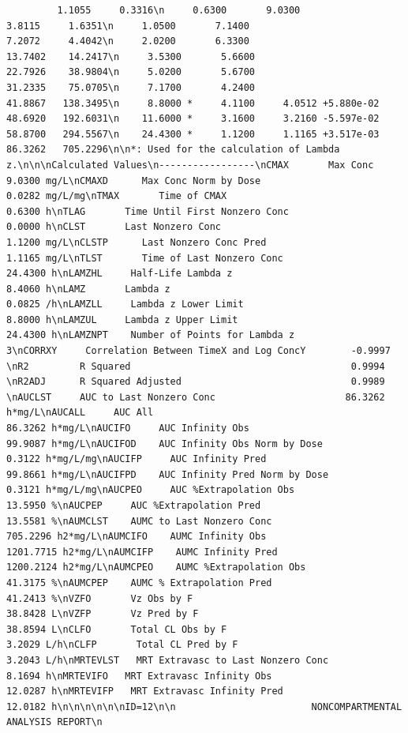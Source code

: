 \documentclass[]{krantz}
\theoremstyle{definition}
\theoremstyle{definition}
\theoremstyle{definition}
\theoremstyle{remark}
\begin{document}
\begin{verbatim}
         1.1055     0.3316\n     0.6300       9.0300                           3.8115     1.6351\n     1.0500       7.1400                           7.2072     4.4042\n     2.0200       6.3300                          13.7402    14.2417\n     3.5300       5.6600                          22.7926    38.9804\n     5.0200       5.6700                          31.2335    75.0705\n     7.1700       4.2400                          41.8867   138.3495\n     8.8000 *     4.1100     4.0512 +5.880e-02    48.6920   192.6031\n    11.6000 *     3.1600     3.2160 -5.597e-02    58.8700   294.5567\n    24.4300 *     1.1200     1.1165 +3.517e-03    86.3262   705.2296\n\n*: Used for the calculation of Lambda z.\n\n\nCalculated Values\n-----------------\nCMAX       Max Conc                                        9.0300 mg/L\nCMAXD      Max Conc Norm by Dose                           0.0282 mg/L/mg\nTMAX       Time of CMAX                                    0.6300 h\nTLAG       Time Until First Nonzero Conc                   0.0000 h\nCLST       Last Nonzero Conc                               1.1200 mg/L\nCLSTP      Last Nonzero Conc Pred                          1.1165 mg/L\nTLST       Time of Last Nonzero Conc                      24.4300 h\nLAMZHL     Half-Life Lambda z                              8.4060 h\nLAMZ       Lambda z                                        0.0825 /h\nLAMZLL     Lambda z Lower Limit                            8.8000 h\nLAMZUL     Lambda z Upper Limit                           24.4300 h\nLAMZNPT    Number of Points for Lambda z                   3\nCORRXY     Correlation Between TimeX and Log ConcY        -0.9997 \nR2         R Squared                                       0.9994 \nR2ADJ      R Squared Adjusted                              0.9989 \nAUCLST     AUC to Last Nonzero Conc                       86.3262 h*mg/L\nAUCALL     AUC All                                        86.3262 h*mg/L\nAUCIFO     AUC Infinity Obs                               99.9087 h*mg/L\nAUCIFOD    AUC Infinity Obs Norm by Dose                   0.3122 h*mg/L/mg\nAUCIFP     AUC Infinity Pred                              99.8661 h*mg/L\nAUCIFPD    AUC Infinity Pred Norm by Dose                  0.3121 h*mg/L/mg\nAUCPEO     AUC %Extrapolation Obs                         13.5950 %\nAUCPEP     AUC %Extrapolation Pred                        13.5581 %\nAUMCLST    AUMC to Last Nonzero Conc                     705.2296 h2*mg/L\nAUMCIFO    AUMC Infinity Obs                            1201.7715 h2*mg/L\nAUMCIFP    AUMC Infinity Pred                           1200.2124 h2*mg/L\nAUMCPEO    AUMC %Extrapolation Obs                        41.3175 %\nAUMCPEP    AUMC % Extrapolation Pred                      41.2413 %\nVZFO       Vz Obs by F                                    38.8428 L\nVZFP       Vz Pred by F                                   38.8594 L\nCLFO       Total CL Obs by F                               3.2029 L/h\nCLFP       Total CL Pred by F                              3.2043 L/h\nMRTEVLST   MRT Extravasc to Last Nonzero Conc              8.1694 h\nMRTEVIFO   MRT Extravasc Infinity Obs                     12.0287 h\nMRTEVIFP   MRT Extravasc Infinity Pred                    12.0182 h\n\n\n\n\n\nID=12\n\n                        NONCOMPARTMENTAL ANALYSIS REPORT\n                   
\end{verbatim}
\end{document}

